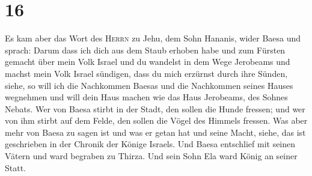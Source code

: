 \hypertarget{section-15}{%
\section{16}\label{section-15}}

 Es kam aber das Wort des \textsc{Herrn} zu Jehu, dem Sohn
Hananis, wider Baesa und sprach:  Darum dass ich dich aus
dem Staub erhoben habe und zum Fürsten gemacht über mein Volk Israel und
du wandelst in dem Wege Jerobeams und machst mein Volk Israel sündigen,
dass du mich erzürnst durch ihre Sünden,  siehe, so will
ich die Nachkommen Baesas und die Nachkommen seines Hauses wegnehmen und
will dein Haus machen wie das Haus Jerobeams, des Sohnes Nebats.
 Wer von Baesa stirbt in der Stadt, den sollen die Hunde
fressen; und wer von ihm stirbt auf dem Felde, den sollen die Vögel des
Himmels fressen.  Was aber mehr von Baesa zu sagen ist und
was er getan hat und seine Macht, siehe, das ist geschrieben in der
Chronik der Könige Israels.  Und Baesa entschlief mit
seinen Vätern und ward begraben zu Thirza. Und sein Sohn Ela ward König
an seiner Statt.

